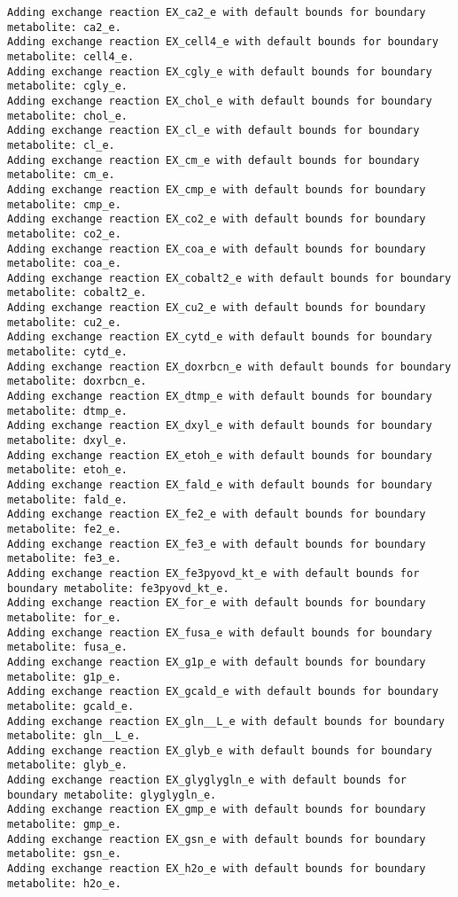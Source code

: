\documentclass[
  letterpaper,
  DIV=11,
  numbers=noendperiod]{scrartcl}
\begin{document}
\begin{verbatim}
Adding exchange reaction EX_ca2_e with default bounds for boundary metabolite: ca2_e.
Adding exchange reaction EX_cell4_e with default bounds for boundary metabolite: cell4_e.
Adding exchange reaction EX_cgly_e with default bounds for boundary metabolite: cgly_e.
Adding exchange reaction EX_chol_e with default bounds for boundary metabolite: chol_e.
Adding exchange reaction EX_cl_e with default bounds for boundary metabolite: cl_e.
Adding exchange reaction EX_cm_e with default bounds for boundary metabolite: cm_e.
Adding exchange reaction EX_cmp_e with default bounds for boundary metabolite: cmp_e.
Adding exchange reaction EX_co2_e with default bounds for boundary metabolite: co2_e.
Adding exchange reaction EX_coa_e with default bounds for boundary metabolite: coa_e.
Adding exchange reaction EX_cobalt2_e with default bounds for boundary metabolite: cobalt2_e.
Adding exchange reaction EX_cu2_e with default bounds for boundary metabolite: cu2_e.
Adding exchange reaction EX_cytd_e with default bounds for boundary metabolite: cytd_e.
Adding exchange reaction EX_doxrbcn_e with default bounds for boundary metabolite: doxrbcn_e.
Adding exchange reaction EX_dtmp_e with default bounds for boundary metabolite: dtmp_e.
Adding exchange reaction EX_dxyl_e with default bounds for boundary metabolite: dxyl_e.
Adding exchange reaction EX_etoh_e with default bounds for boundary metabolite: etoh_e.
Adding exchange reaction EX_fald_e with default bounds for boundary metabolite: fald_e.
Adding exchange reaction EX_fe2_e with default bounds for boundary metabolite: fe2_e.
Adding exchange reaction EX_fe3_e with default bounds for boundary metabolite: fe3_e.
Adding exchange reaction EX_fe3pyovd_kt_e with default bounds for boundary metabolite: fe3pyovd_kt_e.
Adding exchange reaction EX_for_e with default bounds for boundary metabolite: for_e.
Adding exchange reaction EX_fusa_e with default bounds for boundary metabolite: fusa_e.
Adding exchange reaction EX_g1p_e with default bounds for boundary metabolite: g1p_e.
Adding exchange reaction EX_gcald_e with default bounds for boundary metabolite: gcald_e.
Adding exchange reaction EX_gln__L_e with default bounds for boundary metabolite: gln__L_e.
Adding exchange reaction EX_glyb_e with default bounds for boundary metabolite: glyb_e.
Adding exchange reaction EX_glyglygln_e with default bounds for boundary metabolite: glyglygln_e.
Adding exchange reaction EX_gmp_e with default bounds for boundary metabolite: gmp_e.
Adding exchange reaction EX_gsn_e with default bounds for boundary metabolite: gsn_e.
Adding exchange reaction EX_h2o_e with default bounds for boundary metabolite: h2o_e.

\end{verbatim}
\end{document}
